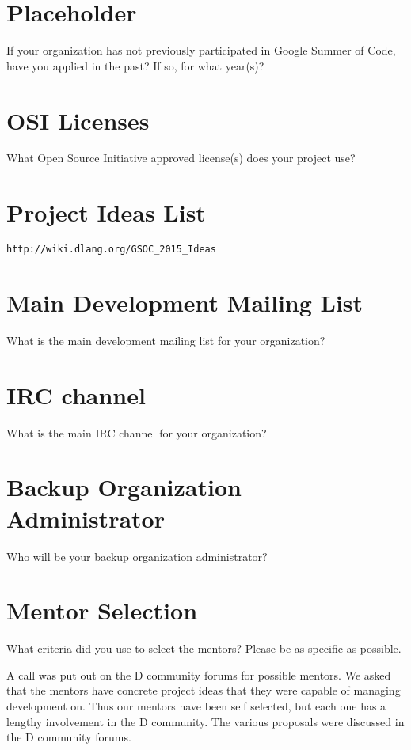 \documentclass[a4paper,12pt]{article}
\begin{document}
\section{Placeholder}

If your organization has not previously participated in Google Summer of Code, 
have you applied in the past? If so, for what year(s)?

\section{OSI Licenses}

What Open Source Initiative approved license(s) does your project use?


\section{Project Ideas List}

\texttt{http://wiki.dlang.org/GSOC\_2015\_Ideas}

\section{Main Development Mailing List}
What is the main development mailing list for your organization?

\section{IRC channel}
What is the main IRC channel for your organization?

\section{Backup Organization Administrator}
Who will be your backup organization administrator?

\section{Mentor Selection}

What criteria did you use to select the mentors? 
Please be as specific as possible.

A call was put out on the D community forums for possible mentors.
We asked that the mentors have concrete project ideas that
they were capable of managing development on.  Thus our mentors
have been self selected, but each one has a lengthy involvement 
in the D community. The various proposals were discussed
in the D community forums. 
\end{document}
